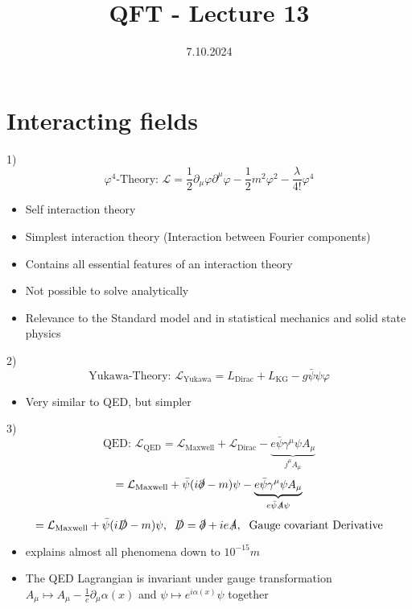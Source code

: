 \documentclass[]{scrartcl}
\title{QFT - Lecture 13}
\author{}
\date{7.10.2024}
\begin{document}
\maketitle
\newpage
\tableofcontents
\newpage

\section{Interacting fields} 

1)
$$
\varphi^4 \text{-Theory: } \mathcal{L} = \frac{1}{2}\partial_\mu\varphi\partial^\mu\varphi - \frac{1}{2}m^2\varphi^2 - \frac{\lambda}{4!}\varphi^4
$$
\begin{itemize}
	\item Self interaction theory
	\item Simplest interaction theory (Interaction between Fourier components)
	\item Contains all essential features of an interaction theory
	\item Not possible to solve analytically
	\item Relevance to the Standard model and in statistical mechanics and solid state physics
\end{itemize}
2)
$$
\text{Yukawa-Theory: } \mathcal{L}_\text{Yukawa} = L_{\text{Dirac}} + L_\text{KG} - g\bar\psi\psi\varphi
$$
\begin{itemize}
	\item Very similar to QED, but simpler
\end{itemize}
3)
$$
\text{QED: } \mathcal{L}_\text{QED} = \mathcal{L}_\text{Maxwell} + \mathcal{L}_\text{Dirac} - \underbrace{e\bar\psi\gamma^\mu\psi A_\mu}_{j^\mu A_\mu}
$$
$$
= \mathcal L_\text{Maxwell} + \bar\psi(i\slashed\partial - m)\psi - \underbrace{e\bar\psi\gamma^\mu\psi A_\mu}_{e\bar\psi \slashed A \psi}
$$
$$
= \mathcal L_\text{Maxwell} + \bar\psi(i\slashed D -m)\psi,\;\; \slashed D = \slashed\partial + ie \slashed A,\;\text{ Gauge covariant Derivative}
$$
\begin{itemize}
	\item explains almost all phenomena down to $10^{-15}m$
	\item The QED Lagrangian is invariant under gauge transformation $A_\mu \mapsto A_\mu - \frac{1}{e}\partial_\mu \alpha(x)$ and $\psi \mapsto e^{i\alpha(x)}\psi$ together
\end{itemize}
\end{document}
